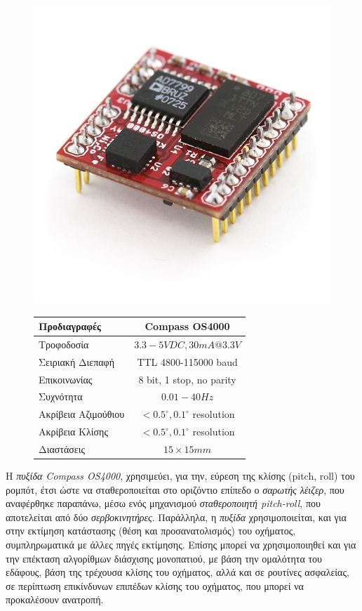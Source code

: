 \begin{enumerate}
\begin{figure}[!ht]
	\begin{minipage}[b]{0.45\textwidth}
		\centering
		\includegraphics[width=0.5\linewidth]{Chapters/Chapter2/Figures/compassOS4000.jpg}
		\label{fig:compassOS4000}
	\end{minipage}		
	\begin{minipage}[b]{0.54\textwidth}
		\centering
		\begin{tabular}{| l | c |}
			\hline
			\textbf{Προδιαγραφές} & \textbf{Compass OS4000}\\ \hline
			Τροφοδοσία & $3.3-5VDC, 30mA @ 3.3V$\\ \hline
			Σειριακή Διεπαφή& TTL 4800-115000 baud\\
			Επικοινωνίας  & 8 bit, 1 stop, no parity\\ \hline
			Συχνότητα & $0.01-40Hz$\\ \hline
			Ακρίβεια Αζιμούθιου & $<0.5^{\circ}, 0.1^{\circ}$ resolution\\ \hline
			Ακρίβεια Κλίσης & $<0.5^{\circ}, 0.1^{\circ}$ resolution\\ \hline
			Διαστάσεις & $15 \times 15 mm$\\ \hline
		\end{tabular}
		\label{tab:compassOS4000}
	\end{minipage}
\end{figure}

Η \textit{πυξίδα Compass OS4000}, χρησιμεύει, για την, εύρεση της κλίσης (pitch, roll) του ρομπότ, έτσι ώστε να σταθεροποιείται στο οριζόντιο επίπεδο ο \textit{σαρωτής λέιζερ}, που αναφέρθηκε παραπάνω, μέσω ενός μηχανισμού \textit{σταθεροποιητή pitch-roll}, που αποτελείται από δύο \textit{σερβοκινητήρες}. Παράλληλα, η \textit{πυξίδα} χρησιμοποιείται, και για στην εκτίμηση κατάστασης (θέση και προσανατολισμός) του οχήματος, συμπληρωματικά με άλλες πηγές εκτίμησης. Επίσης μπορεί να χρησιμοποιηθεί και για την επέκταση αλγορίθμων διάσχισης μονοπατιού, με βάση την ομαλότητα του εδάφους, βάση της τρέχουσα κλίσης του οχήματος, αλλά και σε ρουτίνες ασφαλείας, σε περίπτωση επικίνδυνων επιπέδων κλίσης του οχήματος, που μπορεί να προκαλέσουν ανατροπή.


\end{enumerate}
